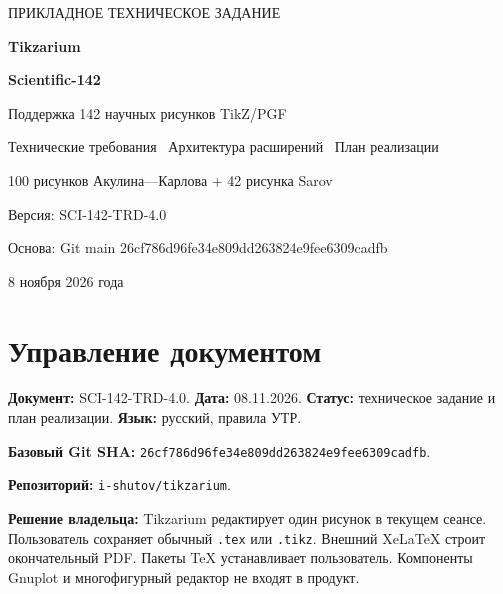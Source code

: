 \documentclass[11pt,a4paper,oneside]{scrreprt}
\begin{document}
\begin{titlepage}
\pagecolor{Soft}
\vspace*{21mm}
{\sffamily\large\color{Accent} ПРИКЛАДНОЕ ТЕХНИЧЕСКОЕ ЗАДАНИЕ}\par
\vspace{15mm}
{\sffamily\bfseries\Huge\color{Ink} Tikzarium}\par
\vspace{4mm}
{\sffamily\bfseries\LARGE\color{Ink} Scientific-142}\par
\vspace{8mm}
{\sffamily\Large Поддержка 142 научных рисунков TikZ/PGF}\par
\vspace{16mm}
\vspace{15mm}
{\sffamily\large Технические требования \textbullet\ Архитектура расширений \textbullet\ План реализации}\par
\vspace{6mm}
{\large 100 рисунков Акулина—Карлова + 42 рисунка Sarov}\par
\vfill
{\sffamily\normalsize Версия: SCI-142-TRD-4.0}\par
{\sffamily\normalsize Основа: Git main 26cf786d96fe34e809dd263824e9fee6309cadfb}\par
{\sffamily\normalsize 8 ноября 2026 года}\par
\end{titlepage}
\nopagecolor
{}
\tableofcontents
\clearpage{}
\chapter{Управление документом}\label{ux443ux43fux440ux430ux432ux43bux435ux43dux438ux435-ux434ux43eux43aux443ux43cux435ux43dux442ux43eux43c}

\textbf{Документ:} SCI-142-TRD-4.0. \textbf{Дата:} 08.11.2026. \textbf{Статус:} техническое задание и план реализации. \textbf{Язык:} русский, правила УТР.

\textbf{Базовый Git SHA:} \texttt{26cf786d96fe34e809dd263824e9fee6309cadfb}.

\textbf{Репозиторий:} \texttt{i-shutov/tikzarium}.

\textbf{Решение владельца:} Tikzarium редактирует один рисунок в текущем сеансе. Пользователь сохраняет обычный \texttt{.tex} или \texttt{.tikz}. Внешний XeLaTeX строит окончательный PDF. Пакеты TeX устанавливает пользователь. Компоненты Gnuplot и многофигурный редактор не входят в продукт.
\end{document}
